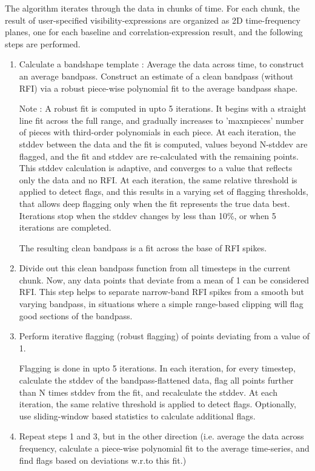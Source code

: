 The algorithm iterates through the data in chunks of time.
For each chunk,  the result of user-specified visibility-expressions 
are organized as 2D time-frequency planes, one for each baseline 
and correlation-expression result, and the following steps are performed.

\begin{enumerate}
\item Calculate a bandshape template : 
Average the data across time, to construct an average bandpass.
     Construct an estimate of a clean bandpass (without RFI) via a
     robust piece-wise polynomial fit to the average bandpass shape.

       Note : A robust fit is computed in upto 5 iterations. 
It begins with a straight line fit across the full range, and gradually increases to 
     'maxnpieces' number of pieces with third-order polynomials in each piece. 
At each iteration, the stddev
                                between the data and the fit is computed, values beyond N-stddev are flagged,
                                and the fit and stddev are re-calculated with the remaining points.
                                This stddev calculation is adaptive, and converges to a value that reflects 
                                only the data and no RFI.  
At each iteration,  the same relative threshold is applied to detect flags, and this results in
a varying set of flagging thresholds,  that allows deep flagging only when the fit represents the true data best.
 Iterations stop when the stddev changes 
     by less than 10\%, or when 5 iterations are completed.

     The resulting clean bandpass is a fit across the base of RFI spikes.

\item  Divide out this clean bandpass function from all timesteps in the current chunk.  
Now, any data points that deviate from a mean of 1 can be considered RFI.  This step 
helps to separate narrow-band RFI spikes from a smooth but varying bandpass, in
situations where a simple range-based clipping will flag good sections of the bandpass.

\item Perform iterative flagging (robust flagging) of points deviating from a value of 1.  

  Flagging is done in upto 5 iterations. 
   In each iteration, for every timestep, calculate the stddev of the bandpass-flattened data, flag all points further than N times stddev from the fit, and recalculate the stddev.
 At each iteration,  the same relative threshold is applied to detect flags.
     Optionally, use sliding-window based statistics to calculate additional flags.

\item Repeat steps 1 and 3, but in the other direction (i.e. average the data across frequency,
     calculate a piece-wise polynomial fit to the average time-series, and find flags
     based on deviations w.r.to this fit.)

\end{enumerate}

